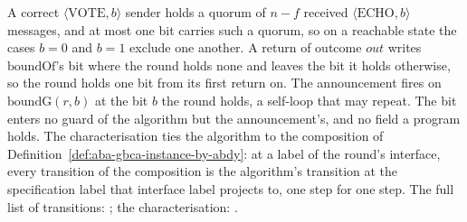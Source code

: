\begin{definition}
  A correct $\langle\mathrm{VOTE}, b\rangle$ sender holds a quorum of $n{-}f$ received $\langle\mathrm{ECHO}, b\rangle$ messages, and at most one bit carries such a quorum, so on a reachable state the cases $b = 0$ and $b = 1$ exclude one another.
  A return of outcome $out$ writes $\mathrm{boundOf}$'s bit where the round holds none and leaves the bit it holds otherwise, so the round holds one bit from its first return on.
  The announcement fires on $\mathrm{boundG}(r,b)$ at the bit $b$ the round holds, a self-loop that may repeat.
  The bit enters no guard of the algorithm but the announcement's, and no field a program holds.
  The characterisation ties the algorithm to the composition of Definition~\ref{def:aba-gbca-instance-by-abdy}: at a label of the round's interface, every transition of the composition is the algorithm's transition at the specification label that interface label projects to, one step for one step.
  The full list of transitions: ; the characterisation: .
\end{definition}
